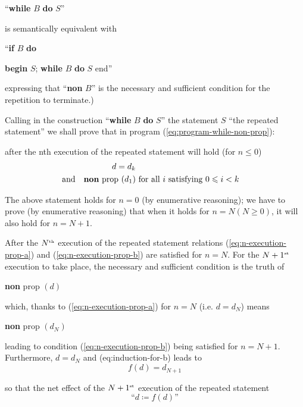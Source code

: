 {
	\setlength{\parindent}{8em}
	``\textbf{while} $B$ \textbf{do} $S$''
}
\medskip

\noindent
is semantically equivalent with
\medskip

{
	\setlength{\parindent}{8em}
	``\textbf{if} $B$ \textbf{do}
	
	\quad \textbf{begin} $S$; \textbf{while} $B$ \textbf{do} $S$ end''
}
\medskip

\noindent
expressing that ``\textbf{non} $B$'' is the necessary and sufficient condition for the repetition to terminate.)

Calling in the construction ``\textbf{while} $B$ \textbf{do} $S$'' the statement $S$ ``the repeated statement'' we shall prove that in program (\ref{eq:program-while-non-prop}):

after the nth execution of the repeated statement will hold (for $n \leqslant 0$)
\begin{subequations}
	\label{eq:n-execution-prop}
	\begin{align}
		\label{eq:n-execution-prop-a}
		d=d_k \\
		\label{eq:n-execution-prop-b}
		\text{and}\quad \text{\textbf{non} prop }(d_1)&\text{ for all } i \text{ satisfying } 0 \leqslant i < k
	\end{align}
\end{subequations}

The above statement holds for $n = 0$ (by enumerative reasoning); we have to prove (by enumerative reasoning) that when it holds for $n = N(N \geqslant 0)$, it will also hold for $n = N + 1$.

After the $N^{\text{\tiny th}}$ execution of the repeated statement relations (\ref{eq:n-execution-prop-a}) and (\ref{eq:n-execution-prop-b}) are satisfied for $n = N$. For the $N + 1^{\text{\tiny st}}$ execution to take place, the necessary and sufficient condition is the truth of
\begin{center}
	\textbf{non} prop $(d)$
\end{center}

\noindent
which, thanks to (\ref{eq:n-execution-prop-a}) for $n = N$ (i.e. $d = d_N$) means
\begin{center}
	\textbf{non} prop $(d_N)$
\end{center}

\noindent 
leading to condition (\ref{eq:n-execution-prop-b}) being satisfied for $n = N + 1$. Furthermore, $d = d_N$ and (eq:induction-for-b) leads to
$$
f(d) = d_{N + 1}
$$

\noindent
so that the net effect of the $N + 1^{\text{\tiny st}}$ execution of the repeated statement
$$
\text{``}d \coloneq f(d)\text{''}
$$

